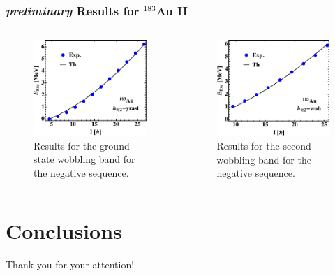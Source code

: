 \documentclass{beamer}
\begin{document}
\begin{frame}
    \frametitle{{\footnotesize \emph{preliminary}} Results for $^{183}$Au II}
    \begin{columns}[c] 
     \begin{figure}
         \centering
         \includegraphics[scale=0.4]{figs/Au_183_plot1Negative.pdf}
         \caption{Results for the ground-state wobbling band for the negative sequence.}
     \end{figure}
     \begin{figure}
         \centering
         \includegraphics[scale=0.4]{figs/Au_183_plot2Negative.pdf}
         \caption{Results for the second wobbling band for the negative sequence.}
     \end{figure}
    \end{columns}
\end{frame}

\section{Conclusions}

  \begin{frame}
  \centering
    \Large{Thank you for your attention!}
  \end{frame}
\end{document}
